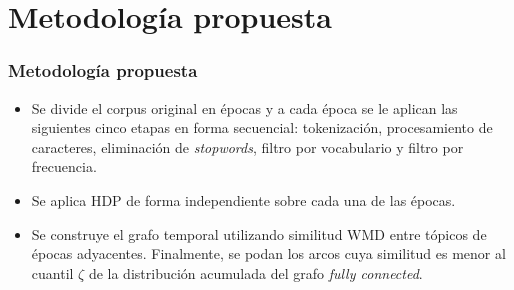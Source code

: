 \documentclass[
	spanish, %
	aspectratio=43, %
	hyperref={pdfencoding=auto,psdextra},
	xcolor={dvipsnames,table,usenames}
]{beamer}
\begin{document}
\section{Metodología propuesta}
\begin{frame}
\frametitle{Metodología propuesta}
\begin{itemize}
  \item Se divide el corpus original en épocas y a cada época se le aplican las siguientes cinco etapas en forma secuencial: tokenización, procesamiento de caracteres, eliminación de \textit{stopwords}, filtro por vocabulario y filtro por frecuencia. 
  \item Se aplica HDP de forma independiente sobre cada una de las épocas. 
  \item Se construye el grafo temporal utilizando similitud WMD entre tópicos de épocas adyacentes. Finalmente, se podan los arcos cuya similitud es menor al cuantil $\zeta$ de la distribución acumulada del grafo \textit{fully connected}.
\end{itemize}


\end{frame}
\end{document}
